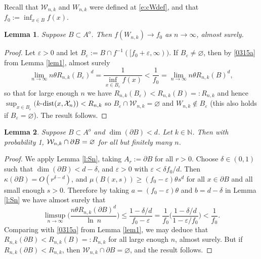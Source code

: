 \documentclass[12pt]{article}
\newcommand{\N}{\mathbb{N}}
\newcommand{\cW}{\mathcal{W}}
\newcommand{\X}{\mathcal{X}}
\renewcommand{\emptyset}{\varnothing}
\newcommand{\eps}{\varepsilon}
\newcommand{\dist}{{\rm dist}}
\renewcommand{\log}{{\ln \:}}
\newtheorem{lemm}{Lemma}
\begin{document}
Recall that 
	$\cW_{n,k}$ and $W_{n,k}$  were defined at \eqref{e:cWdef},
	and that $f_0:= \inf_{x \in B} f(x)$.
\begin{lemm}
\label{lemWn2}
	Suppose $B \subset A^o$.
	Then $f(W_{n,k}) \to f_0$ as $n \to \infty$, almost surely.
\end{lemm}
\begin{proof}
	Let $\eps >0$ and
let
	$
	B_{\eps} := B \cap f^{-1}([f_0 + \eps, \infty)).
	$
If $B_\eps \neq \emptyset$, then by 
	\eqref{0315a} from
	Lemma \ref{lem1}, almost surely
$$
	\lim_{n \to \infty} n \theta R_{n,k}(B_\eps)^d
	= \frac{1}{\inf_{x \in B_\eps} f(x)} < \frac{1}{f_0} = 
	\lim_{n \to \infty} n \theta R_{n,k}(B)^d,
	$$
	so that for large enough $n$ we have
	$
	R_{n,k}(B_\eps) < R_{n,k}(B) =: R_{n,k}$ and hence
	$ \sup_{x \in B_\eps}(k$-$\dist(x,\X_n)) < R_{n,k}$
	so $B_\eps \cap  \cW_{n,k} = \emptyset$ and $W_{n,k}
	\notin B_\eps$ (this also holds if $B_\eps = \emptyset$).
	The result follows.
\end{proof}
\begin{lemm}
\label{lemEn}
	Suppose $B \subset A^o$ and $\dim(\partial B) < d$.
	Let $k \in \N$.
	 Then with probability 1,
	 ${\cal W}_{n,k} \cap \partial B = \emptyset$ 
	 for all but finitely many $n$.
\end{lemm}
\begin{proof}
	We apply Lemma \ref{l:Sn},
	taking $A_{r} := \partial B$
	for all $r >0$.  Choose $\delta \in (0,1)$ such that
	$\dim(\partial B) < d- \delta$, and
	$\eps >0$ with $\eps < \delta f_0/d$. Then $\kappa (\partial B)
	= O(r^{\delta -d})$, and $\mu(B(x,s)) \geq (f_0 - \eps)
	\theta s^d$
	for all $x \in \partial B$ and all
	small enough $s >0$. Therefore by taking
	$a = (f_0 - \eps) \theta$ and $b= d-  \delta$
	in Lemma \ref{l:Sn} we have almost surely that
	$$
	\limsup_{n \to \infty}
	\Big( \frac{n \theta  R_{n,k}(\partial B)^d }{\log n} \Big)  \leq 
	\frac{ 1- \delta/d}{f_0 - \eps} 
	= \frac{1}{f_0}\Big(\frac{1- \delta/d}{1 - \eps/f_0} \Big)
	< \frac{1}{f_0}
	.
	$$
	Comparing with \eqref{0315a} from Lemma \ref{lem1}, we may deduce that
	$R_{n,k}(\partial B) < R_{n,k}(B) =: R_{n,k}$ for all large enough $n$,
	almost surely. But if $R_{n,k}(\partial B) < R_{n,k}$,
	then $\cW_{n,k} \cap \partial B = \emptyset$,
	and the result follows.
\end{proof}
\end{document}
